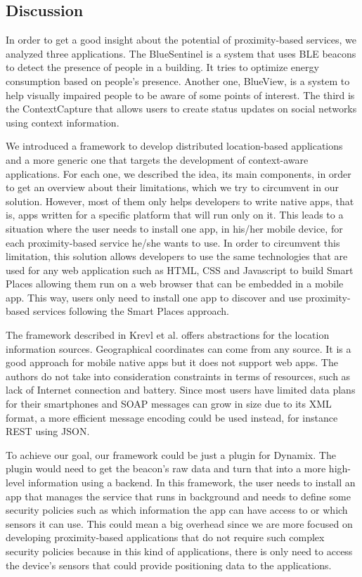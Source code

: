 \subsection{Discussion}
\label{sub:solution_related_work_discussion}
In order to get a good insight about the potential of proximity-based services, we analyzed three applications.
The BlueSentinel is a system that uses \gls{BLE} beacons to detect the presence of people in a building. It tries to optimize energy consumption based on people's presence.
Another one, BlueView, is a system to help visually impaired people to be aware of some points of interest.
The third is the ContextCapture that allows users to create status updates on social networks using context information.

We introduced a framework to develop distributed location-based applications and a more generic one that targets the development of context-aware applications.
For each one, we described the idea, its main components, in order to get an overview about their limitations, which we try to circumvent in our solution.
However, most of them only helps developers to write native apps, that is, apps written for a specific platform that will run only on it.
This leads to a situation where the user needs to install one app, in his/her mobile device, for each proximity-based service he/she wants to use.
In order to circumvent this limitation, this solution allows developers
to use the same technologies that are used for any web application such as \gls{HTML}, \gls{CSS} and Javascript to build Smart Places allowing them run on a web browser that can be embedded in a mobile app. This way, users only need to install one app to discover and use proximity-based services following the Smart Places approach.

The framework described in Krevl et al.\cite{Krevl2006} offers abstractions for the location information sources.
Geographical coordinates can
come from any source.
It is a good approach for
mobile native apps but it does not support web apps.
The authors do not take into consideration
constraints in terms of resources, such as
lack of Internet connection and battery.
Since most users have limited data plans for
their smartphones and \gls{SOAP} messages can
grow in size due to its \gls{XML} format,
a more efficient message encoding could be used
instead, for instance \gls{REST} using \gls{JSON}.

To achieve our goal, our framework could be just a
plugin for Dynamix. The plugin would
need to get the beacon's raw data and
turn that into a more high-level information
using a backend. In this framework,
the user needs to install an app that manages the service
that runs in background and needs to define some
security policies such as which information the app can have access to or which sensors it can use.
This could mean a big overhead since we are more focused on developing proximity-based applications that do not require such complex security policies because in this kind of applications, there is only need to access the device's sensors that could provide positioning data to the applications.

